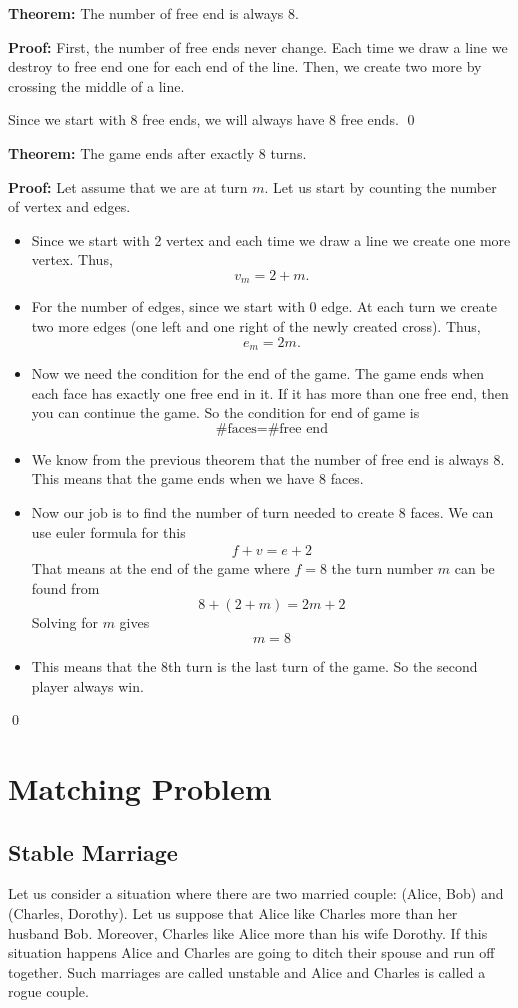 \documentclass[a4paper, 12pt]{article}
\newcommand{\theorem}{\vspace{1em}\noindent\textbf{Theorem:} }
\renewcommand{\proof}{\vspace{0.5em}\noindent\textbf{Proof:} }
\newcommand{\qedd}{\qed\newline}
\begin{document}
	\theorem The number of free end is always 8.
	
	\proof First, the number of free ends never change. Each time we draw a line we destroy to free end one for each end of the line. Then, we create two more by crossing the middle of a line. 
	
	Since we start with 8 free ends, we will always have 8 free ends.
	\qedd
	
	\theorem The game ends after exactly 8 turns.
	
	\proof Let assume that we are at turn $m$. Let us start by counting the number of vertex and edges.
	\begin{itemize}
	\item Since we start with 2 vertex and each time we draw a line we create one more vertex. Thus,
	\[
		v_m = 2+m.
	\]
	
	\item For the number of edges, since we start with 0 edge. At each turn we create two more edges (one left and one right of the newly created cross). Thus,
	\[
		e_m = 2m.
	\]
	
	\item Now we need the condition for the end of the game. The game ends when each face has exactly one free end in it. If it has more than one free end, then you can continue the game. So the condition for end of game is
	\[
		\text{\# faces} = \text{\# free end}
	\]
	
	\item We know from the previous theorem that the number of free end is always 8. This means that the game ends when we have $8$ faces.
	
	\item Now our job is to find the number of turn needed to create 8 faces. We can use euler formula for this
	\begin{align*}
		f + v = e+2
	\end{align*}
	That means at the end of the game where $f=8$ the turn number $m$  can be found from
	\[
		8 + (2 +m) = 2m + 2
	\]
	Solving for $m$ gives
	\[
		m = 8
	\]
	
	\item This means that the 8th turn is the last turn of the game. So the second player always win.
	\end{itemize}
	\qedd
	\section*{Matching Problem}
	\subsection*{Stable Marriage}
		Let us consider a situation where there are two married couple: (Alice, Bob) and (Charles, Dorothy). Let us suppose that Alice like Charles more than her husband Bob. Moreover, Charles like Alice more than his wife Dorothy. If this situation happens Alice and Charles are going to ditch their spouse and run off together. Such marriages are called unstable and Alice and Charles is called a rogue couple.
		
\end{document}
